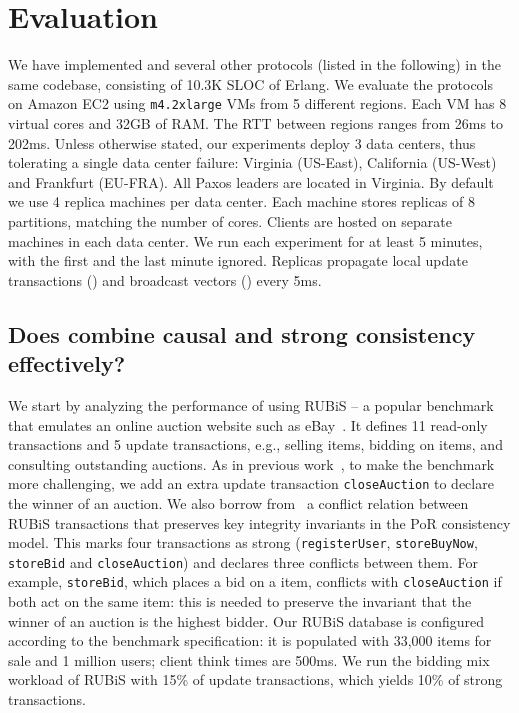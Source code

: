 \section{Evaluation}
\label{sec:eval}





We have implemented \System and several other protocols (listed in the
following) in the same codebase, consisting of
10.3K SLOC of Erlang. We evaluate the protocols on Amazon EC2 using
\texttt{m4.2xlarge} VMs from 5 different
regions. 
Each VM has 8 virtual cores and 32GB of RAM. 
The RTT between regions ranges from 26ms to 202ms. 
Unless otherwise stated, our experiments deploy 3 data centers, thus tolerating
a single data center failure: Virginia (US-East), California (US-West) and
Frankfurt (EU-FRA).
All Paxos leaders are located in Virginia.  By default we use 4 replica machines
per data center. Each machine stores replicas of 8
partitions, matching the number of cores. 
Clients are hosted on separate machines in each data center.
We run each experiment for at least 5 minutes, with the first and the last
minute ignored. Replicas propagate local update transactions
() and broadcast vectors
() every 5ms.



\subsection{Does \System combine causal and strong consistency
  effectively?}
\label{sec:performance}

We start by analyzing the performance of \System using RUBiS -- a popular
benchmark that emulates an online auction website such as eBay~\cite{por,
  red-blue}. It defines 11 read-only transactions and 5 update transactions,
e.g., selling items, bidding on items, and consulting outstanding auctions. As
in previous work~\cite{por}, to make the benchmark more challenging, we add an
extra update transaction \texttt{closeAuction} to declare the winner of an
auction. We also borrow from~\cite{por} a conflict relation between RUBiS
transactions that preserves key integrity invariants in the PoR
consistency model. This marks four transactions as strong
(\texttt{registerUser}, \texttt{storeBuyNow}, \texttt{storeBid} and
\texttt{closeAuction}) and declares three conflicts between them. For example,
\texttt{storeBid}, which places a bid on a item, conflicts with
\texttt{closeAuction} if both act on the same item: this is needed to preserve
the invariant that the winner of an auction is the highest bidder. Our RUBiS
database is configured according to the benchmark specification: it is populated
with 33,000 items for sale and 1 million users; client think times are
500ms.
We run the bidding mix workload of RUBiS with 15\% of update
transactions, which yields 10\% of strong transactions.

